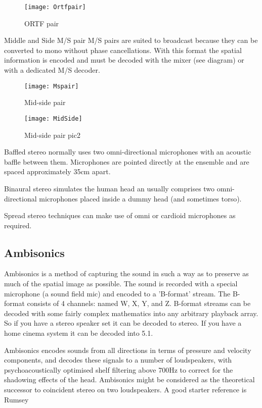 \begin{figure}[H]
\centering
\texttt{[image: Ortfpair]}\caption{ORTF pair}
\label{fig:ortfpair}
\end{figure}

Middle and Side M/S pair
M/S pairs are suited to broadcast because they can be converted to mono without phase cancellations. With this format the spatial information is encoded and must be decoded with the mixer (see diagram) or with a dedicated M/S decoder.

\begin{figure}[H]
\centering
\texttt{[image: Mspair]}\caption{Mid-side pair}
\label{fig:midsidepair}
\end{figure}

\begin{figure}[H]
\centering
\texttt{[image: MidSide]}\caption{Mid-side pair pic2}
\label{fig:midsidepair2}
\end{figure}

Baffled stereo normally uses two omni-directional microphones with an acoustic baffle between them. Microphones are pointed directly at the ensemble and are spaced approximately 35cm apart.

Binaural stereo simulates the human head an usually comprises two omni-directional microphones placed inside a dummy head (and sometimes torso).

Spread stereo techniques can make use of omni or cardioid microphones as required. 

\subsection{Ambisonics}
Ambisonics is a method of capturing the sound in such a way as to preserve as much of the spatial image as possible. The sound is recorded with a special microphone (a sound field mic) and encoded to a 'B-format' stream. The B-format consists of 4 channels: named W, X, Y, and Z. B-format streams can be decoded with some fairly complex mathematics into any arbitrary playback array. So if you have a stereo speaker set it can be decoded to stereo. If you have a home cinema system it can be decoded into 5.1.


Ambisonics encodes sounds from all directions in terms of pressure and velocity components, and decodes these signals to a number of loudspeakers, with psychoacoustically optimised shelf filtering above 700Hz to correct for the shadowing effects of the head. Ambisonics might be considered as the theoretical successor to coincident stereo on two loudspeakers. A good starter reference is Rumsey \citep[pp402-407]{rumsey2006sound} 

